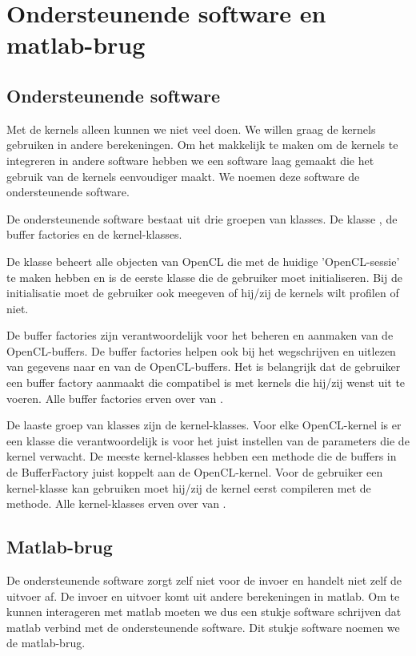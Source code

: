 \chapter{Ondersteunende software en matlab-brug}
\label{h:ondersteunende}
\section{Ondersteunende software}
Met de kernels alleen kunnen we niet veel doen. We willen graag de kernels gebruiken in andere berekeningen. Om het makkelijk te maken om de kernels te integreren in andere software hebben we een software laag gemaakt die het gebruik van de kernels eenvoudiger maakt. We noemen deze software de ondersteunende software.

De ondersteunende software bestaat uit drie groepen van klasses. De klasse , de buffer factories en de kernel-klasses.

De klasse  beheert alle objecten van OpenCL die met de huidige 'OpenCL-sessie' te maken hebben en is de eerste klasse die de gebruiker moet initialiseren. Bij de initialisatie moet de gebruiker ook meegeven of hij/zij de kernels wilt profilen of niet.

De buffer factories zijn verantwoordelijk voor het beheren en aanmaken van de OpenCL-buffers. De buffer factories helpen ook bij het wegschrijven en uitlezen van gegevens naar en van de OpenCL-buffers. Het is belangrijk dat de gebruiker een buffer factory aanmaakt die compatibel is met kernels die hij/zij wenst uit te voeren. Alle buffer factories erven over van .

De laaste groep van klasses zijn de kernel-klasses. Voor elke OpenCL-kernel is er een klasse die verantwoordelijk is voor het juist instellen van de parameters die de kernel verwacht. De meeste kernel-klasses hebben een methode  die de buffers in de BufferFactory juist koppelt aan de OpenCL-kernel. Voor de gebruiker een kernel-klasse kan gebruiken moet hij/zij de kernel eerst compileren met de  methode. Alle kernel-klasses erven over van .

\section{Matlab-brug}
De ondersteunende software zorgt zelf niet voor de invoer en handelt niet zelf de uitvoer af. De invoer en uitvoer komt uit andere berekeningen in matlab. Om te kunnen interageren met matlab moeten we dus een stukje software schrijven dat matlab verbind met de ondersteunende software. Dit stukje software noemen we de matlab-brug.